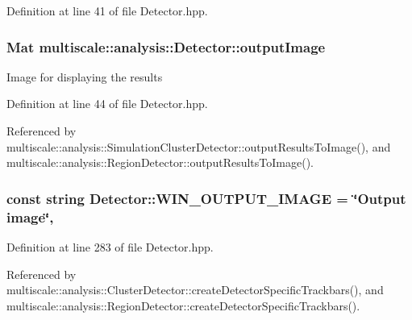 Definition at line 41 of file Detector.\-hpp.

\hypertarget{classmultiscale_1_1analysis_1_1Detector_a144e080a3af03c9bf3d8a80315823c86}{
\subsubsection[{output\-Image}]{\setlength{\rightskip}{0pt plus 5cm}Mat multiscale\-::analysis\-::\-Detector\-::output\-Image\hspace{0.3cm}{\ttfamily [protected]}}}\label{classmultiscale_1_1analysis_1_1Detector_a144e080a3af03c9bf3d8a80315823c86}
Image for displaying the results 

Definition at line 44 of file Detector.\-hpp.



Referenced by multiscale\-::analysis\-::\-Simulation\-Cluster\-Detector\-::output\-Results\-To\-Image(), and multiscale\-::analysis\-::\-Region\-Detector\-::output\-Results\-To\-Image().

\hypertarget{classmultiscale_1_1analysis_1_1Detector_a883b5de8d273a2bfab31e45bc285c78d}{
\subsubsection[{W\-I\-N\-\_\-\-O\-U\-T\-P\-U\-T\-\_\-\-I\-M\-A\-G\-E}]{\setlength{\rightskip}{0pt plus 5cm}const string Detector\-::\-W\-I\-N\-\_\-\-O\-U\-T\-P\-U\-T\-\_\-\-I\-M\-A\-G\-E = \char`\"{}Output {\bf image}\char`\"{}\hspace{0.3cm}{\ttfamily [static]}, {\ttfamily [protected]}}}\label{classmultiscale_1_1analysis_1_1Detector_a883b5de8d273a2bfab31e45bc285c78d}


Definition at line 283 of file Detector.\-hpp.



Referenced by multiscale\-::analysis\-::\-Cluster\-Detector\-::create\-Detector\-Specific\-Trackbars(), and multiscale\-::analysis\-::\-Region\-Detector\-::create\-Detector\-Specific\-Trackbars().

